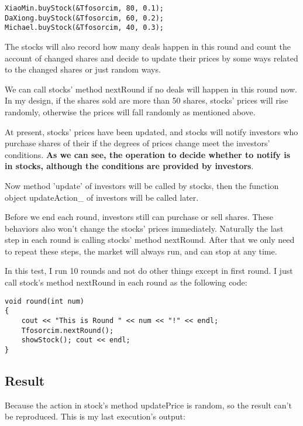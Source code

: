 \documentclass{article}
\begin{document}
\begin{lstlisting}
XiaoMin.buyStock(&Tfosorcim, 80, 0.1);
DaXiong.buyStock(&Tfosorcim, 60, 0.2);
Michael.buyStock(&Tfosorcim, 40, 0.3);
\end{lstlisting}

    The stocks will also record how many deals happen in this round and count the account of changed shares and decide to update their prices by some ways related to the changed shares or just random ways.

    We can call stocks' method nextRound if no deals will happen in this round now. In my design, if the shares sold are more than 50 shares, stocks' prices will rise randomly, otherwise the prices will fall randomly as mentioned above.

    At present, stocks' prices have been updated, and stocks will notify investors who purchase shares of their if the degrees of prices change meet the investors' conditions. \textbf{As we can see, the operation to decide whether to notify is in stocks, although the conditions are provided by investors}.

    Now method 'update' of investors will be called by stocks, then the function object updateAction\_ of investors will be called later.

    Before we end each round, investors still can purchase or sell shares. These behaviors also won't change the stocks' prices immediately. Naturally the last step in each round is calling stocks' method nextRound. After that we only need to repeat these steps, the market will always run, and can stop at any time.

    In this test, I run 10 rounds and not do other things except in first round. I just call stock's method nextRound in each round as the following code:

\begin{lstlisting}
void round(int num)
{
    cout << "This is Round " << num << "!" << endl;
    Tfosorcim.nextRound();
    showStock(); cout << endl;
}
\end{lstlisting}

\subsection{Result}

    Because the action in stock's method updatePrice is random, so the result can't be reproduced. This is my last execution's output:
\end{document}
